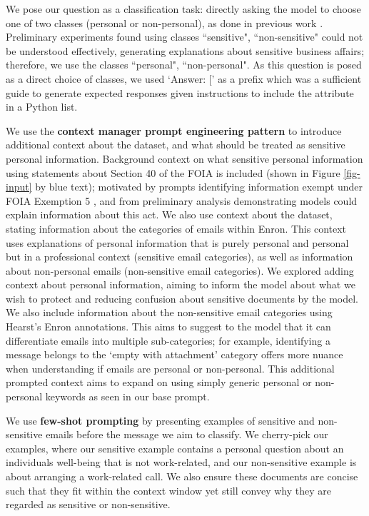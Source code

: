 We pose our question as a classification task: directly asking the model to choose one of two classes (personal or non-personal), as done in previous work \cite{kocon2023chatgpt, puri2019zero}. Preliminary experiments found using classes ``sensitive", ``non-sensitive" could not be understood effectively, generating explanations about sensitive business affairs; therefore, we use the classes ``personal", ``non-personal". As this question is posed as a direct choice of classes, we used `Answer: [' as a prefix which was a sufficient guide to generate expected responses given instructions to include the attribute in a Python list.

We use the \textbf{context manager prompt engineering pattern} to introduce additional context about the dataset, and what should be treated as sensitive personal information. Background context on what sensitive personal information using statements about Section 40 of the FOIA is included (shown in Figure \ref{fig-input} by blue text); motivated by prompts identifying information exempt under FOIA Exemption 5 \cite{baron2023using}, and from preliminary analysis demonstrating models could explain information about this act. We also use context about the dataset, stating information about the categories of emails within Enron. This context uses explanations of personal information that is purely personal and personal but in a professional context (sensitive email categories), as well as information about non-personal emails (non-sensitive email categories). We explored adding context about personal information, aiming to inform the model about what we wish to protect and reducing confusion about sensitive documents by the model. We also include information about the non-sensitive email categories using Hearst’s Enron annotations. This aims to suggest to the model that it can differentiate emails into multiple sub-categories; for example, identifying a message belongs to the ‘empty with attachment’ category offers more nuance when understanding if emails are personal or non-personal. This additional prompted context aims to expand on using simply generic personal or non-personal keywords as seen in our base prompt.

We use \textbf{few-shot prompting} by presenting examples of sensitive and non-sensitive emails before the message we aim to classify. We cherry-pick our examples, where our sensitive example contains a personal question about an individuals well-being that is not work-related, and our non-sensitive example is about arranging a work-related call. We also ensure these documents are concise such that they fit within the context window yet still convey why they are regarded as sensitive or non-sensitive.

